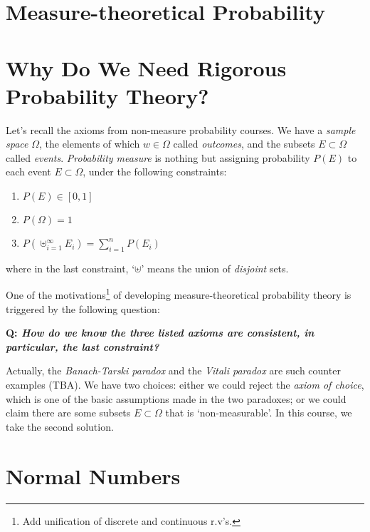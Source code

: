 \section{Measure-theoretical Probability}
\section{Why Do We Need Rigorous Probability Theory?}
Let's recall the axioms from non-measure probability courses. We have a \emph{sample space} $\Omega$, the elements of which $w \in \Omega$ called \emph{outcomes}, and the subsets $E \subset \Omega$ called \emph{events}. \emph{Probability measure} is nothing but assigning probability $P(E)$ to each event $E \subset \Omega$, under the following constraints:
\begin{enumerate}
	\item $P(E) \in [0,1]$
	\item $P(\Omega) = 1$
	\item $P(\uplus_{i=1}^\infty E_i) = \sum_{i=1}^n P(E_i)$
\end{enumerate}
where in the last constraint, `$\uplus$' means the union of \emph{disjoint} sets.

One of the motivations\footnote{Add unification of discrete and continuous r.v's.} of developing measure-theoretical probability theory is triggered by the following question:

\vspace{2 mm}
\textbf{Q: \emph{How do we know the three listed axioms are consistent, in particular, the last constraint?}}
\vspace{0.5 mm}

Actually, the \emph{Banach-Tarski paradox} and the \emph{Vitali paradox} are such counter examples (TBA). We have two choices: either we could reject the \emph{axiom of choice}, which is one of the basic assumptions made in the two paradoxes; or we could claim there are some subsets $E \subset \Omega$ that is `non-measurable'. In this course, we take the second solution.

\section{Normal Numbers}

